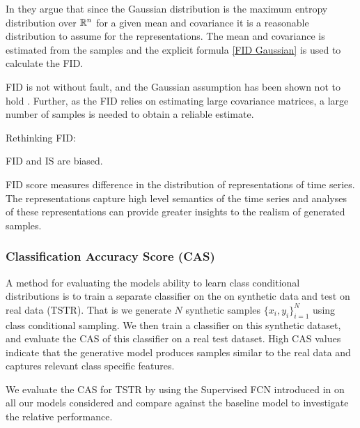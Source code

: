 \documentclass[../../thesis.tex]{subfiles}
\begin{document}
In \cite{heusel2018gans} they argue that since the Gaussian distribution is the maximum entropy distribution over $\mathbb{R}^n$ for a given mean and covariance it is a reasonable distribution to assume for the representations. The mean and covariance is estimated from the samples and the explicit formula \ref{FID Gaussian} is used to calculate the FID. \newline

FID is not without fault, and the Gaussian assumption has been shown not to hold \cite{jayasumana2024rethinking}. Further, as the FID relies on estimating large covariance matrices, a large number of samples is needed to obtain a reliable estimate.\newline

Rethinking FID: \cite{jayasumana2024rethinking} \newline

\cite{chong2020effectively} FID and IS are biased.\newline

FID score measures difference in the distribution of representations of time series. The representations capture high level semantics of the time series and analyses of these representations can provide greater insights to the realism of generated samples. \newline


\subsubsection{Classification Accuracy Score (CAS)}
A method for evaluating the models ability to learn class conditional distributions is to train a separate classifier on the on synthetic data and test on real data (TSTR). That is we generate $N$ synthetic samples $\{x_i,y_i\}_{i=1}^N$ using class conditional sampling. We then train a classifier on this synthetic dataset, and evaluate the CAS of this classifier on a real test dataset. High CAS values indicate that the generative model produces samples similar to the real data and captures relevant class specific features.\newline

We evaluate the CAS for TSTR by using the Supervised FCN introduced in \cite{TimeVQVAE} on all our models considered and compare against the baseline model to investigate the relative performance. 
\end{document}
